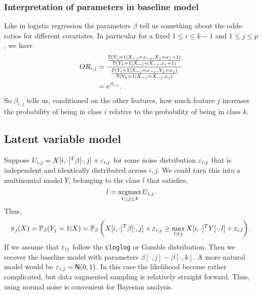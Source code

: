 \subsubsection{Interpretation of parameters in baseline model}
Like in logistic regression the parameters $\beta$ tell us something about the odds-ratios for different covariates. In particular for a fixed $1 \le i \le k-1 $ and $1 \le j\le p$, we have 
\begin{align*}
    OR_{i,j} &=\frac{\frac{{\mathbb{P}}(Y_{i}=1|X_{-j}=x_{-j}, X_j = x_j+1)}{{\mathbb{P}}(Y_{k}=1|X_{-j}=X_{-j}, x_j+1)}}{\frac{{\mathbb{P}}(Y_{i}=1|X_{-j}=x_{-j}, X_j = x_j)}{{\mathbb{P}}(Y_{k}=1|X_{-j}=X_{-j}, x_j)}}\\
    &=e^{\beta_{i,j}}.
\end{align*}
So $\beta_{i,j}$ tells us, conditioned on the other features, how much feature $j$ increases the probability of being in class $i$ relative to the probability of being in class $k$.
\subsection{Latent variable model}
Suppose $U_{i,j} = X[i,\cdot]^T\beta[\cdot, j]+\varepsilon_{i,j}$ for some noise distribution $\varepsilon_{i,j}$ that is independent and identically distributed across $i,j$. We could turn this into a multinomial model $Y_i$ belonging to the class $l$ that satisfies,
\[l = \operatorname*{argmax}_{1 \le j \le k} U_{i,j}. \]
Thus, 
\[\pi_j(X) = {\mathbb{P}}_\beta(Y_j = 1|X) = {\mathbb{P}}_\beta\left(X[i,\cdot]^T\beta[\cdot,j] + \varepsilon_{i,j} \ge \max_{l \neq j}X[i,\cdot]^TY[\cdot,l]+\varepsilon_{i,l}\right). \]
If we assume that $\varepsilon_{ij}$ follow the \texttt{cloglog} or Gumble distribution. Then we recover the baseline model with parameters $\beta[\cdot,j] -\beta[\cdot,k]$. A more natural model would be $\varepsilon_{i,j} \sim \mathsf{N}(0,1)$. In this case the likelihood become rather complicated, but data augmented sampling is relatively straight forward. Thus, using normal noise is convenient for Bayesian analysis.

